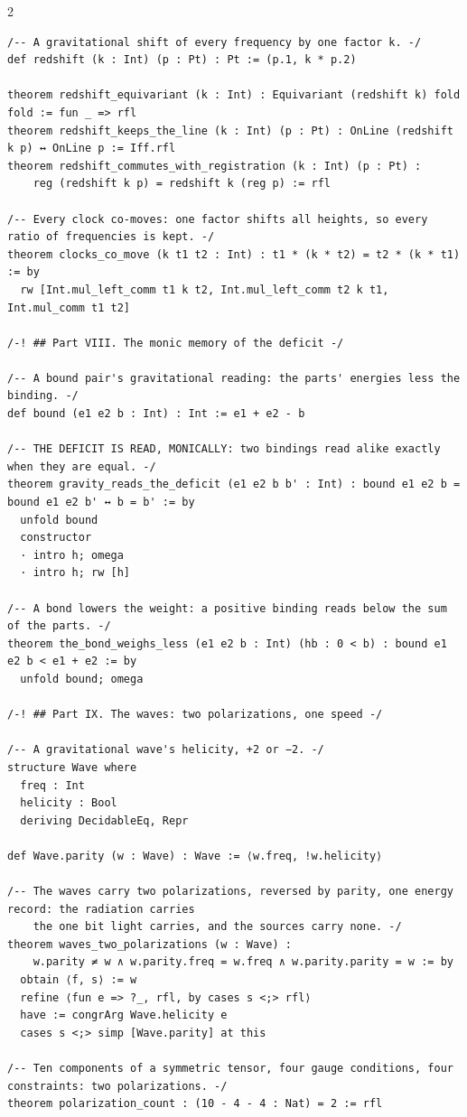 \documentclass[10pt]{article}
\begin{document}
\begin{multicols}{2}
\begin{Verbatim}[fontsize=\fontsize{5.9}{6.8}\selectfont,breaklines,breakanywhere,breaksymbolleft={}]
/-- A gravitational shift of every frequency by one factor k. -/
def redshift (k : Int) (p : Pt) : Pt := (p.1, k * p.2)

theorem redshift_equivariant (k : Int) : Equivariant (redshift k) fold fold := fun _ => rfl
theorem redshift_keeps_the_line (k : Int) (p : Pt) : OnLine (redshift k p) ↔ OnLine p := Iff.rfl
theorem redshift_commutes_with_registration (k : Int) (p : Pt) :
    reg (redshift k p) = redshift k (reg p) := rfl

/-- Every clock co-moves: one factor shifts all heights, so every ratio of frequencies is kept. -/
theorem clocks_co_move (k t1 t2 : Int) : t1 * (k * t2) = t2 * (k * t1) := by
  rw [Int.mul_left_comm t1 k t2, Int.mul_left_comm t2 k t1, Int.mul_comm t1 t2]

/-! ## Part VIII. The monic memory of the deficit -/

/-- A bound pair's gravitational reading: the parts' energies less the binding. -/
def bound (e1 e2 b : Int) : Int := e1 + e2 - b

/-- THE DEFICIT IS READ, MONICALLY: two bindings read alike exactly when they are equal. -/
theorem gravity_reads_the_deficit (e1 e2 b b' : Int) : bound e1 e2 b = bound e1 e2 b' ↔ b = b' := by
  unfold bound
  constructor
  · intro h; omega
  · intro h; rw [h]

/-- A bond lowers the weight: a positive binding reads below the sum of the parts. -/
theorem the_bond_weighs_less (e1 e2 b : Int) (hb : 0 < b) : bound e1 e2 b < e1 + e2 := by
  unfold bound; omega

/-! ## Part IX. The waves: two polarizations, one speed -/

/-- A gravitational wave's helicity, +2 or −2. -/
structure Wave where
  freq : Int
  helicity : Bool
  deriving DecidableEq, Repr

def Wave.parity (w : Wave) : Wave := ⟨w.freq, !w.helicity⟩

/-- The waves carry two polarizations, reversed by parity, one energy record: the radiation carries
    the one bit light carries, and the sources carry none. -/
theorem waves_two_polarizations (w : Wave) :
    w.parity ≠ w ∧ w.parity.freq = w.freq ∧ w.parity.parity = w := by
  obtain ⟨f, s⟩ := w
  refine ⟨fun e => ?_, rfl, by cases s <;> rfl⟩
  have := congrArg Wave.helicity e
  cases s <;> simp [Wave.parity] at this

/-- Ten components of a symmetric tensor, four gauge conditions, four constraints: two polarizations. -/
theorem polarization_count : (10 - 4 - 4 : Nat) = 2 := rfl


\end{Verbatim}
\end{multicols}
\end{document}
